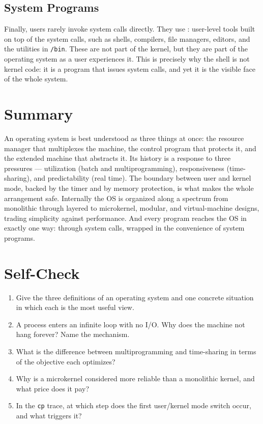 \documentclass[11pt]{article}
\begin{document}
\subsection{System Programs}

Finally, users rarely invoke system calls directly. They use : user-level tools built on top of the system calls, such as shells, compilers, file managers, editors, and the utilities in \texttt{/bin}. These are not part of the kernel, but they are part of the operating system as a user experiences it. This is precisely why the shell is not kernel code: it is a program that issues system calls, and yet it is the visible face of the whole system.

\section{Summary}

An operating system is best understood as three things at once: the resource manager that multiplexes the machine, the control program that protects it, and the extended machine that abstracts it. Its history is a response to three pressures --- utilization (batch and multiprogramming), responsiveness (time-sharing), and predictability (real time). The boundary between user and kernel mode, backed by the timer and by memory protection, is what makes the whole arrangement safe. Internally the OS is organized along a spectrum from monolithic through layered to microkernel, modular, and virtual-machine designs, trading simplicity against performance. And every program reaches the OS in exactly one way: through system calls, wrapped in the convenience of system programs.

\section*{Self-Check}

\begin{enumerate}
  \item Give the three definitions of an operating system and one concrete situation in which each is the most useful view.
  \item A process enters an infinite loop with no I/O. Why does the machine not hang forever? Name the mechanism.
  \item What is the difference between multiprogramming and time-sharing in terms of the objective each optimizes?
  \item Why is a microkernel considered more reliable than a monolithic kernel, and what price does it pay?
  \item In the \texttt{cp} trace, at which step does the first user/kernel mode switch occur, and what triggers it?
\end{enumerate}
\end{document}
